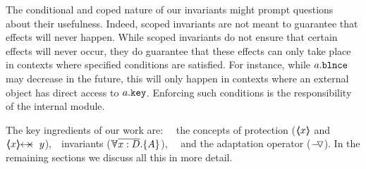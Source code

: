 The conditional and coped nature of our invariants might prompt questions about their usefulness.
 Indeed, scoped invariants are not meant to guarantee that effects will never happen. 
While scoped invariants do not ensure that certain effects will never occur, they do guarantee that these effects can only take place in contexts where specified conditions are satisfied. For instance, while   $a.\mbox{\normalfont{\texttt{\mbox{\normalfont{\texttt{blnce}}}}}}$ may  decrease in the future, this will only happen in contexts where an external object has direct access to  $a.\mbox{\normalfont{\texttt{key}}}$. 
 Enforcing such conditions is the responsibility of the internal module.
 
 
The key ingredients of our work are: \ \ the concepts of protection ($\langle\!\!\langle x \rangle\!\!\rangle$ and $\protectedFrom {x} {y}$),\ \  \scoped invariants (${\TwoStatesN {\overline {x:D}} {A}}$), \ \  and  the adaptation operator ($ { } \!-\!\!\!\,\!{\triangledown} { } $).
 In the remaining sections we discuss all this in more detail.

 

 


 

 



 
 
